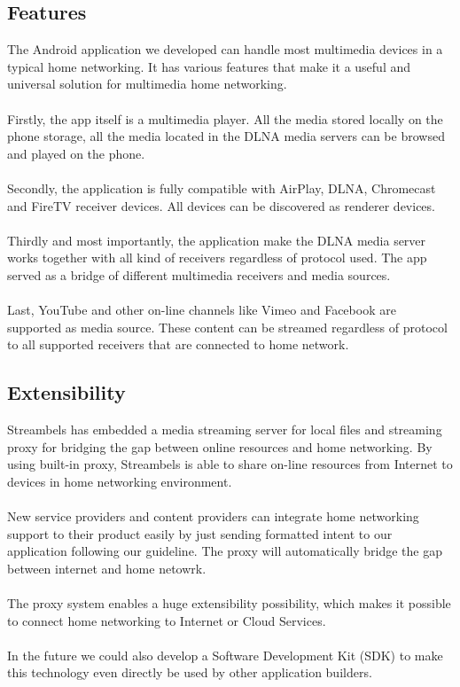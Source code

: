 \subsection{Features}
The Android application we developed can handle most multimedia devices in a typical home networking. It has various features that make it a useful and universal solution for multimedia home networking.\\
\\
Firstly, the app itself is a multimedia player. All the media stored locally on the phone storage, all the media located in the DLNA media servers can be browsed and played on the phone.\\
\\
Secondly, the application is fully compatible with AirPlay, DLNA, Chromecast and FireTV receiver devices. All devices can be discovered as renderer devices.\\
\\ 
Thirdly and most importantly, the application make the DLNA media server works together with all kind of receivers regardless of protocol used. The app served as a bridge of different multimedia receivers and media sources.\\
\\
Last, YouTube and other on-line channels like Vimeo and Facebook are supported as media source. These content can be streamed regardless of protocol to all supported receivers that are connected to home network.

\subsection{Extensibility}
Streambels has embedded a media streaming server for local files and streaming proxy for bridging the gap between online resources and home networking. By using built-in proxy, Streambels is able to share on-line resources from Internet to devices in home networking environment. \\
\\
New service providers and content providers can integrate home networking support to their product easily by just sending formatted intent to our application following our guideline. The proxy will automatically bridge the gap between internet and home netowrk.\\
\\
The proxy system enables a huge extensibility possibility, which makes it possible to connect home networking to Internet or Cloud Services.\\
\\
In the future we could also develop a Software Development Kit (SDK) to make this technology even directly be used by other application builders.
